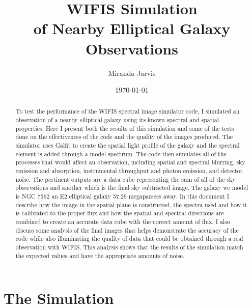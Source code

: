 \documentclass[11pt,twoside]{article}
\title{WIFIS Simulation \\ of Nearby Elliptical Galaxy Observations}
\author{Miranda Jarvis}
\date{\today}
\begin{document}
\maketitle

\begin{abstract}

To test the performance of the WIFIS spectral image simulator code, I simulated an observation of a nearby elliptical galaxy using its known spectral and spatial properties. Here I present both the results of this simulation and some of the tests done on the effectiveness of the code and the quality of the images produced. The simulator uses Galfit to create the spatial light profile of the galaxy and the spectral element is added through a model spectrum. The code then simulates all of the processes that would affect an observation, including spatial and spectral blurring, sky emission and absorption, instrumental throughput and photon emission, and detector noise. The pertinent outputs are a data cube representing the sum of all of the sky observations and another which is the final sky subtracted image. The galaxy we model is NGC 7562 an E2 elliptical galaxy 57.29 megaparsecs away. In this document I describe how the image in the spatial plane is constructed, the spectra used and how it is calibrated to the proper flux and how the spatial and spectral directions are combined to create an accurate data cube with the correct amount of flux. I also discuss some analysis of the final images that helps demonstrate the accuracy of the code while also illuminating the quality of data that could be obtained through a real observation with WIFIS. This analysis shows that the results of the simulation match the expected values and have the appropriate amounts of noise.
\end{abstract}

\section{The Simulation} \label{simulation}
\end{document}
